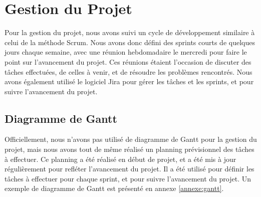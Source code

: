 \section{Gestion du Projet}

Pour la gestion du projet, nous avons suivi un cycle de développement similaire à celui de la méthode Scrum. 
Nous avons donc défini des sprints courts de quelques jours chaque semaine, avec une réunion hebdomadaire
le mercredi pour faire le point sur l'avancement du projet. 
Ces réunions étaient l'occasion de discuter des tâches effectuées, de celles à venir, et de résoudre les problèmes rencontrés.
Nous avons également utilisé le logiciel Jira pour gérer les tâches et les sprints, et pour suivre l'avancement du projet.

\subsection{Diagramme de Gantt}
Officiellement, nous n'avons pas utilisé de diagramme de Gantt pour la gestion du projet, mais nous avons tout de même
réalisé un planning prévisionnel des tâches à effectuer.
Ce planning a été réalisé en début de projet, et a été mis à jour régulièrement pour refléter l'avancement du projet.
Il a été utilisé pour définir les tâches à effectuer pour chaque sprint, et pour suivre l'avancement du projet.
Un exemple de diagramme de Gantt est présenté en annexe \ref{annexe:gantt}.


